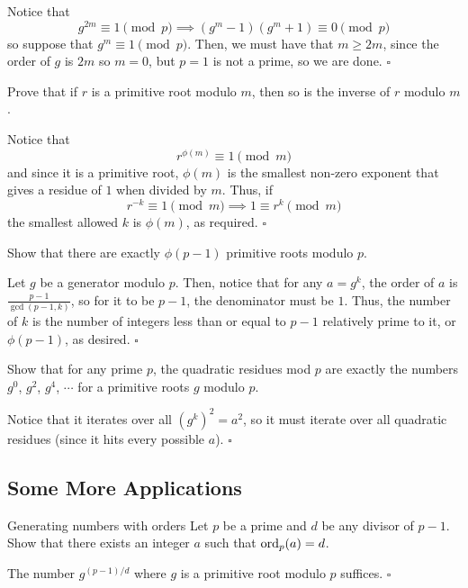 \documentclass{article}
\begin{document}
Notice that \[g^{2m} \equiv 1 \pmod{p} \implies (g^m-1)(g^m+1) \equiv 0 \pmod{p}\] so suppose that $g^m \equiv 1 \pmod{p}$. Then, we must have that $m \ge 2m$, since the order of $g$ is $2m$ so $m = 0$, but $p = 1$ is not a prime, so we are done. $\square$

\begin{problem}[5.5.2]{}
Prove that if $r$ is a primitive root modulo $m$, then so is the inverse of $r$ modulo $m$.
\end{problem}

Notice that \[r^{\phi(m)} \equiv 1 \pmod{m}\] and since it is a primitive root, $\phi(m)$ is the smallest non-zero exponent that gives a residue of $1$ when divided by $m$. Thus, if \[r^{-k} \equiv 1 \pmod{m} \implies 1 \equiv r^k \pmod{m}\] the smallest allowed $k$ is $\phi(m)$, as required. $\square$

\begin{problem}[5.5.3]{}
Show that there are exactly $\phi(p - 1)$ primitive roots modulo $p$.
\end{problem}

Let $g$ be a generator modulo $p$. Then, notice that for any $a = g^k$, the order of $a$ is $\tfrac{p-1}{\gcd(p-1, k)}$, so for it to be $p-1$, the denominator must be $1$. Thus, the number of $k$ is the number of integers less than or equal to $p-1$ relatively prime to it, or $\phi(p-1)$, as desired. $\square$

\begin{problem}[5.5.4]{}
Show that for any prime $p$, the quadratic residues mod $p$ are exactly the
numbers $g^0$, $g^2$, $g^4$, $\cdots$ for a primitive roots $g$ modulo $p$.
\end{problem}

Notice that it iterates over all $(g^k)^2 = a^2$, so it must iterate over all quadratic residues (since it hits every possible $a$). $\square$

\subsection{Some More Applications}

\begin{problem}[5.6.1]{Generating numbers with orders}
Let $p$ be a prime and $d$ be any divisor of $p - 1$. Show that there exists an integer $a$ such that $\operatorname{ord}_p(a) = d$.
\end{problem}

The number $g^{(p-1)/d}$ where $g$ is a primitive root modulo $p$ suffices. $\square$
\end{document}
